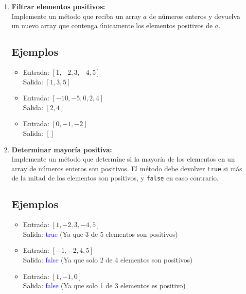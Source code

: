\begin{enumerate}[label=\alph*)]
    \item \textbf{Filtrar elementos positivos:} \\
    Implemente un método que reciba un array \(a\) de números enteros y devuelva un nuevo array que contenga únicamente los elementos positivos de \(a\).

    \subsection*{Ejemplos}
    \begin{itemize}
        \item Entrada: \([1, -2, 3, -4, 5]\) \\
        Salida: \([1, 3, 5]\)
        \item Entrada: \([-10, -5, 0, 2, 4]\) \\
        Salida: \([2, 4]\)
        \item Entrada: \([0, -1, -2]\) \\
        Salida: \([]\)
    \end{itemize}

    \item \textbf{Determinar mayoría positiva:} \\
    Implemente un método que determine si la mayoría de los elementos en un array de números enteros son positivos. El método debe devolver \texttt{true} si más de la mitad de los elementos son positivos, y \texttt{false} en caso contrario.

    \subsection*{Ejemplos}
    \begin{itemize}
        \item Entrada: \([1, -2, 3, -4, 5]\) \\
        Salida: \textcolor{blue}{true}  (Ya que 3 de 5 elementos son positivos)
        \item Entrada: \([-1, -2, 4, 5]\) \\
        Salida: \textcolor{blue}{false}  (Ya que solo 2 de 4 elementos son positivos)
        \item Entrada: \([1, -1, 0]\) \\
        Salida: \textcolor{blue}{false}  (Ya que solo 1 de 3 elementos es positivo)
    \end{itemize}
\end{enumerate}